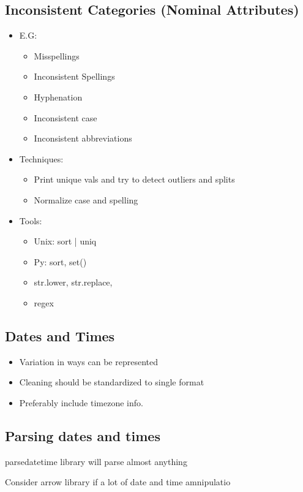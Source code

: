 \documentclass[a4paper]{article}
\begin{document}
\subsection{Inconsistent Categories (Nominal Attributes)}
\begin{itemize}
	\item E.G:
	\begin{itemize}
		\item Misspellings
		\item Inconsistent Spellings
		\item Hyphenation
		\item Inconsistent case
		\item Inconsistent abbreviations
	\end{itemize}
	\item Techniques:
	\begin{itemize}
		\item Print unique vals and try to detect outliers and splits
		\item Normalize case and spelling
	\end{itemize}
	\item Tools:
	\begin{itemize}
		\item Unix: sort | uniq
		\item Py: sort, set()
		\item str.lower, str.replace,
		\item regex
	\end{itemize}
\end{itemize}
\subsection{Dates and Times}
\begin{itemize}
	\item Variation in ways can be represented
	\item Cleaning should be standardized to single format
	\item Preferably include timezone info.
\end{itemize}
\subsection{Parsing dates and times}
parsedatetime library will parse almost anything
\par Consider arrow library if a lot of date and time amnipulatio
\end{document}
